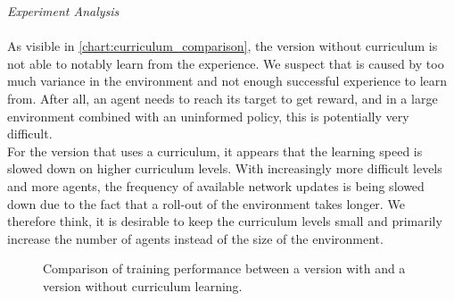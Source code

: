 \textit{Experiment Analysis}\\\\
As visible in \autoref{chart:curriculum_comparison}, the version without curriculum is not able to notably learn from the experience. We suspect that is caused by too much variance in the environment and not enough successful experience to learn from. After all, an agent needs to reach its target to get reward, and in a large environment combined with an uninformed policy, this is potentially very difficult.\\
For the version that uses a curriculum, it appears that the learning speed is slowed down on higher curriculum levels. With increasingly more difficult levels and more agents, the frequency of available network updates is being slowed down due to the fact that a roll-out of the environment takes longer. We therefore think, it is desirable to keep the curriculum levels small and primarily increase the number of agents instead of the size of the environment.
\begin{figure}[H]
	\begin{center}
		
	\end{center}
	\caption{Comparison of training performance between a version with and a version without curriculum learning.\\}
	\label{chart:curriculum_comparison}
\end{figure}
